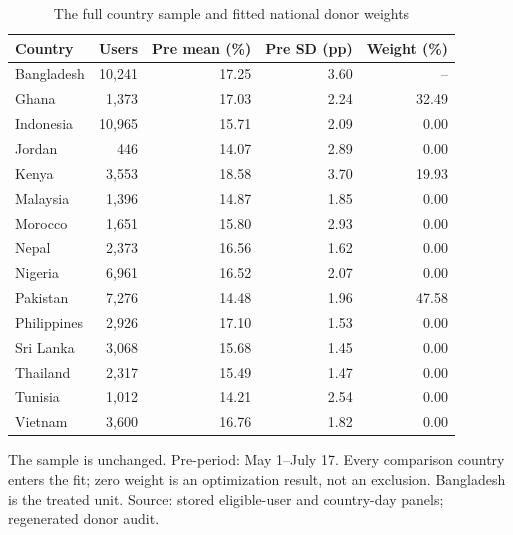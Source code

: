 \begin{table}[H]
\centering
\small
\caption{The full country sample and fitted national donor weights}
\label{tab:advisor_donors}
\begin{threeparttable}
\begin{tabular}{@{}lrrrr@{}}
\toprule
Country & Users & Pre mean (\%) & Pre SD (pp) & Weight (\%) \\
\midrule
Bangladesh & 10,241 & 17.25 & 3.60 & -- \\
Ghana & 1,373 & 17.03 & 2.24 & 32.49 \\
Indonesia & 10,965 & 15.71 & 2.09 & 0.00 \\
Jordan & 446 & 14.07 & 2.89 & 0.00 \\
Kenya & 3,553 & 18.58 & 3.70 & 19.93 \\
Malaysia & 1,396 & 14.87 & 1.85 & 0.00 \\
Morocco & 1,651 & 15.80 & 2.93 & 0.00 \\
Nepal & 2,373 & 16.56 & 1.62 & 0.00 \\
Nigeria & 6,961 & 16.52 & 2.07 & 0.00 \\
Pakistan & 7,276 & 14.48 & 1.96 & 47.58 \\
Philippines & 2,926 & 17.10 & 1.53 & 0.00 \\
Sri Lanka & 3,068 & 15.68 & 1.45 & 0.00 \\
Thailand & 2,317 & 15.49 & 1.47 & 0.00 \\
Tunisia & 1,012 & 14.21 & 2.54 & 0.00 \\
Vietnam & 3,600 & 16.76 & 1.82 & 0.00 \\
\bottomrule
\end{tabular}
\begin{tablenotes}[flushleft]
\footnotesize
\item The sample is unchanged. Pre-period: May 1--July 17. Every comparison country enters the fit; zero weight is an optimization result, not an exclusion. Bangladesh is the treated unit. Source: stored eligible-user and country-day panels; regenerated donor audit.
\end{tablenotes}
\end{threeparttable}
\end{table}
